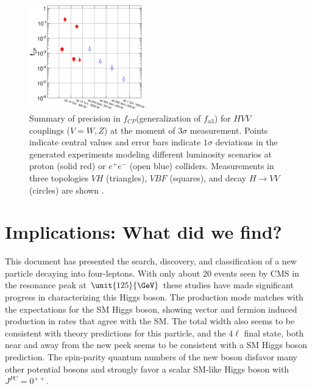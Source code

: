 \begin{figure}
  \centering
    \includegraphics[width=0.45\textwidth]{Conclusion/summary_fcp.eps}
    \caption[Summary of precision in $f_{CP}$(generalization of $f_{a3}$) for $HVV$ couplings ($V = W, Z$) at the moment of $3\sigma$ measurement. Points indicate central values and error bars indicate $1\sigma$ deviations in the generated experiments modeling different luminosity scenarios at proton (solid red) or $e^{+}e^{-}$ (open blue) colliders. Measurements in three topologies $VH$ (triangles), $VBF$ (squares), and decay $H \to VV$ (circles) are shown.]{
       Summary of precision in $f_{CP}$(generalization of $f_{a3}$) for $HVV$ couplings ($V = W, Z$) at the moment of $3\sigma$ measurement. Points indicate central values and error bars indicate $1\sigma$ deviations in the generated experiments modeling different luminosity scenarios at proton (solid red) or $e^{+}e^{-}$ (open blue) colliders. Measurements in three topologies $VH$ (triangles), $VBF$ (squares), and decay $H \to VV$ (circles) are shown \cite{Anderson:2013afp}.
      \label{fig:fa3_project}
      }

\end{figure}

\section{Implications: What did we find?}

This document has presented the search, discovery, and classification of a new particle decaying into four-leptons. With only about 20 events seen by CMS in the resonance peak at $\unit{125}{\GeV}$ these studies have made significant progress in characterizing this Higgs boson. The production mode matches with the expectations for the SM Higgs boson, showing vector and fermion induced production in rates that agree with the SM. The total width also seems to be consistent with theory predictions for this particle, and the $4\ell$ final state, both near and away from the new peek seems to be consistent with a SM Higgs boson prediction. The spin-parity quantum numbers of the new boson disfavor many other potential bosons and strongly favor a scalar SM-like Higgs boson with $J^{PC} = 0^{++}$.

